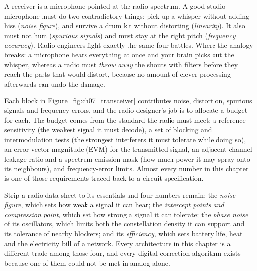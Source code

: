 \begin{analogy}
A receiver is a microphone pointed at the radio spectrum. A good studio microphone must do two
contradictory things: pick up a whisper without adding hiss (\emph{noise figure}), and survive a
drum kit without distorting (\emph{linearity}). It also must not hum (\emph{spurious signals}) and
must stay at the right pitch (\emph{frequency accuracy}). Radio engineers fight exactly the same four
battles. Where the analogy breaks: a microphone hears everything at once and your brain picks out the
whisper, whereas a radio must \emph{throw away} the shouts with filters before they reach the parts
that would distort, because no amount of clever processing afterwards can undo the damage.
\end{analogy}

Each block in Figure~\ref{fig:ch07_transceiver} contributes noise, distortion, spurious signals and
frequency errors, and the radio designer's job is to allocate a budget for each. The budget comes from
the standard the radio must meet: a reference sensitivity (the weakest signal it must decode), a set
of blocking and intermodulation tests (the strongest interferers it must tolerate while doing so), an
error-vector magnitude (EVM) for the transmitted signal, an adjacent-channel leakage ratio and a
spectrum emission mask (how much power it may spray onto its neighbours), and frequency-error limits.
Almost every number in this chapter is one of those requirements traced back to a circuit
specification.


\begin{keyidea}
Strip a radio data sheet to its essentials and four numbers remain: the \emph{noise figure}, which sets
how weak a signal it can hear; the \emph{intercept points and compression point}, which set how strong
a signal it can tolerate; the \emph{phase noise} of its oscillators, which limits both the
constellation density it can support and its tolerance of nearby blockers; and its \emph{efficiency},
which sets battery life, heat and the electricity bill of a network. Every architecture in this chapter
is a different trade among those four, and every digital correction algorithm exists because one of
them could not be met in analog alone.
\end{keyidea}

